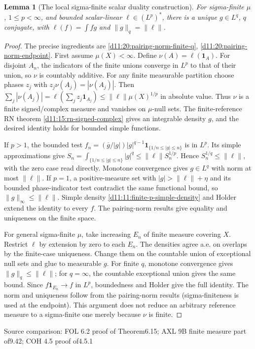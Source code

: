 \documentclass[11pt,oneside,openany]{book}
\newtheorem{lemma}[theorem]{Lemma}
\theoremstyle{definition}
\theoremstyle{remark}
\newcommand{\one}{\mathbf1}\newcommand{\ind}[1]{\mathbf1_{#1}}
\newcommand{\family}[1]{}
\newcommand{\source}[1]{\par\begingroup\small\sffamily\color{black!65}Source comparison: #1\par\endgroup}
\begin{document}
\begin{lemma}[The local sigma-finite scalar duality construction]\family{D11.20.lp_dual_sigmafinite_local}\label{d11:20:lp-dual-sigmafinite-local}
For sigma-finite $\mu$, $1\le p<\infty$, and bounded scalar-linear $\ell\in(L^p)^*$, there is a unique $g\in L^q$, $q$ conjugate, with $\ell(f)=\int fg$ and $\|g\|_q=\|\ell\|$.
\end{lemma}
\begin{proof}
The precise ingredients are \cref{d11:20:pairing-norm-finite-q}, \cref{d11:20:pairing-norm-endpoint}. First assume $\mu(X)<\infty$. Define $\nu(A)=\ell(\one_A)$. For disjoint $A_n$, the indicators of the finite unions converge in $L^p$ to that of their union, so $\nu$ is countably additive. For any finite measurable partition choose phases $z_j$ with $z_j\nu(A_j)=|\nu(A_j)|$. Then
$\sum_j|\nu(A_j)|=\ell(\sum_jz_j\one_{A_j})\le\|\ell\|\mu(X)^{1/p}$ in absolute value. Thus $\nu$ is a finite signed/complex measure and vanishes on $\mu$-null sets. The finite-reference RN theorem \cref{d11:15:rn-signed-complex} gives an integrable density $g$, and the desired identity holds for bounded simple functions.

If $p>1$, the bounded test $f_n=(\overline g/|g|)|g|^{q-1}\one_{\{1/n\le|g|\le n\}}$ is in $L^p$. Its simple approximations give $S_n=\int_{\{1/n\le|g|\le n\}}|g|^q\le\|\ell\|S_n^{1/p}$. Hence $S_n^{1/q}\le\|\ell\|$, with the zero case read directly. Monotone convergence gives $g\in L^q$ with norm at most $\|\ell\|$. If $p=1$, a positive-measure set with $|g|>\|\ell\|+\eta$ and its bounded phase-indicator test contradict the same functional bound, so $\|g\|_\infty\le\|\ell\|$. Simple density \cref{d11:11:finite-p-simple-density} and Holder extend the identity to every $f$. The pairing-norm results give equality and uniqueness on the finite space.

For general sigma-finite $\mu$, take increasing $E_n$ of finite measure covering $X$. Restrict $\ell$ by extension by zero to each $E_n$. The densities agree a.e. on overlaps by the finite-case uniqueness. Change them on the countable union of exceptional null sets and glue to measurable $g$. For finite $q$, monotone convergence gives $\|g\|_q\le\|\ell\|$; for $q=\infty$, the countable exceptional union gives the same bound. Since $f\one_{E_n}\to f$ in $L^p$, boundedness and Holder give the full identity. The norm and uniqueness follow from the pairing-norm results (sigma-finiteness is used at the endpoint). This argument does not reduce an arbitrary reference measure to a sigma-finite one merely because $\nu$ is finite.
\end{proof}
\source{FOL 6.2 proof of Theorem6.15; AXL 9B finite measure part of9.42; COH 4.5 proof of4.5.1}
\end{document}
